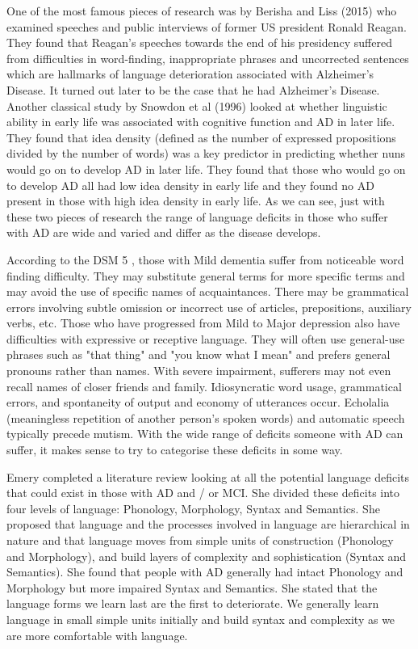 \documentclass[a4paper]{article}
\begin{document}
\par
One of the most famous pieces of research was by Berisha and Liss (2015) \cite{Berisha2015} who examined speeches and public interviews of former US president Ronald Reagan. They found that Reagan's speeches towards the end of his presidency suffered from difficulties in word-finding, inappropriate phrases and uncorrected sentences which are hallmarks of language deterioration associated with Alzheimer's Disease. It turned out later to be the case that he had Alzheimer's Disease. Another classical study by Snowdon et al (1996) \cite{Snowdon1996} looked at whether linguistic ability in early life was associated with cognitive function and AD in later life. They found that idea density (defined as the number of expressed propositions divided by the number of words) was a key predictor in predicting whether nuns would go on to develop AD in later life. They found that those who would go on to develop AD all had low idea density in early life and they found no AD present in those with high idea density in early life. As we can see, just with these two pieces of research the range of language deficits in those who suffer with AD are wide and varied and differ as the disease develops. \newline
\par
According to the DSM 5 \cite{AmericanPsychiatricAssociation2013}, those with Mild dementia suffer from noticeable word finding difficulty. They may substitute general terms for more specific terms and may avoid the use of specific names of acquaintances. There may be grammatical errors involving subtle omission or incorrect use of articles, prepositions, auxiliary verbs, etc. Those who have progressed from Mild to Major depression also have difficulties with expressive or receptive language. They will often use general-use phrases such as "that thing" and "you know what I mean" and prefers general pronouns rather than names. With severe impairment, sufferers may not even recall names of closer friends and family. Idiosyncratic word usage, grammatical errors, and spontaneity of output and economy of utterances occur. Echolalia (meaningless repetition of another person's spoken words) and automatic speech typically precede mutism. With the wide range of deficits someone with AD can suffer, it makes sense to try to categorise these deficits in some way.\newline
\par
Emery \cite{Emery2000} completed a literature review looking at all the potential language deficits that could exist in those with AD and / or MCI. She divided these deficits into four levels of language: Phonology, Morphology, Syntax and Semantics. She proposed that language and the processes involved in language are hierarchical in nature and that language moves from simple units of construction (Phonology and Morphology), and build layers of complexity and sophistication (Syntax and Semantics). She found that people with AD generally had intact Phonology and Morphology but more impaired Syntax and Semantics. She stated that the language forms we learn last are the first to deteriorate. We generally learn language in small simple units initially and build syntax and complexity as we are more comfortable with language.\newline
\end{document}

